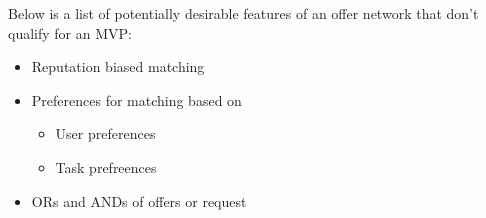 \documentclass[main.tex]{subfiles}
\begin{document}
Below is a list of potentially desirable features of an offer network that don't qualify for an MVP:
\begin{itemize}
  \item Reputation biased matching
  \item Preferences for matching based on
    \begin{itemize}
      \item User preferences
      \item Task prefreences
    \end{itemize}
  \item ORs and ANDs of offers or request
\end{itemize}
\end{document}
